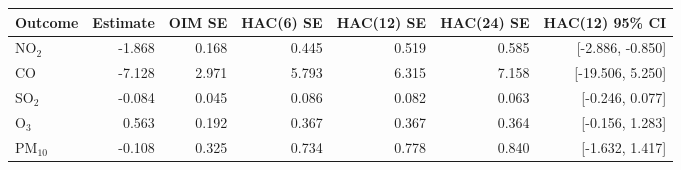 \begin{tabular}{lrrrrrr}
\toprule
Outcome & Estimate & OIM SE & HAC(6) SE & HAC(12) SE & HAC(24) SE & HAC(12) 95\% CI \\
\midrule
NO$_2$ & -1.868 & 0.168 & 0.445 & 0.519 & 0.585 & [-2.886, -0.850] \\
CO & -7.128 & 2.971 & 5.793 & 6.315 & 7.158 & [-19.506, 5.250] \\
SO$_2$ & -0.084 & 0.045 & 0.086 & 0.082 & 0.063 & [-0.246, 0.077] \\
O$_3$ & 0.563 & 0.192 & 0.367 & 0.367 & 0.364 & [-0.156, 1.283] \\
PM$_{10}$ & -0.108 & 0.325 & 0.734 & 0.778 & 0.840 & [-1.632, 1.417] \\
\bottomrule
\end{tabular}
